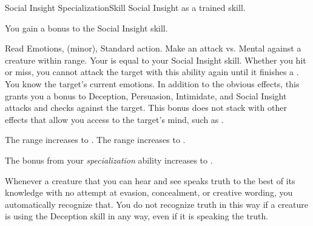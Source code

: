     \begin{feat}{Social Insight Specialization}{Skill}
        \featpre Social Insight as a trained skill.

         You gain a  bonus to the Social Insight skill.

        \begin{sustainability}{Read Emotions}{,  (minor), }
            \abilityusagetime Standard action.
            \rankline
            Make an attack vs. Mental against a creature within \rngshort range.
            Your  is equal to your Social Insight skill.
            Whether you hit or miss, you cannot attack the target with this ability again until it finishes a .
            \hit You know the target's current emotions.
            In addition to the obvious effects, this grants you a  bonus to Deception, Persuasion, Intimidate, and Social Insight attacks and checks against the target.
            This bonus does not stack with other effects that allow you access to the target's mind, such as .

            \rankline
             The range increases to \medrange.
             The range increases to \longrange.
        \end{sustainability}

         The bonus from your \textit{specialization} ability increases to .

         Whenever a creature that you can hear and see speaks truth to the best of its knowledge with no attempt at evasion, concealment, or creative wording, you automatically recognize that.
        You do not recognize truth in this way if a creature is using the Deception skill in any way, even if it is speaking the truth.
    \end{feat}

